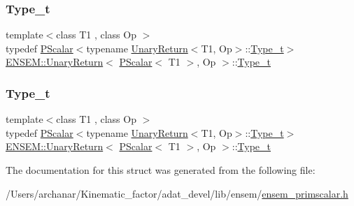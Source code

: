 \subsubsection{\texorpdfstring{Type\_t}{Type\_t}\hspace{0.1cm}{\footnotesize\ttfamily [1/2]}}
{\footnotesize\ttfamily template$<$class T1 , class Op $>$ \\
typedef \mbox{\hyperlink{classENSEM_1_1PScalar}{P\+Scalar}}$<$typename \mbox{\hyperlink{structENSEM_1_1UnaryReturn}{Unary\+Return}}$<$T1, Op$>$\+::\mbox{\hyperlink{structENSEM_1_1UnaryReturn_3_01PScalar_3_01T1_01_4_00_01Op_01_4_a75130a6bdc9f60586c1614ed4177aa96}{Type\+\_\+t}}$>$ \mbox{\hyperlink{structENSEM_1_1UnaryReturn}{E\+N\+S\+E\+M\+::\+Unary\+Return}}$<$ \mbox{\hyperlink{classENSEM_1_1PScalar}{P\+Scalar}}$<$ T1 $>$, Op $>$\+::\mbox{\hyperlink{structENSEM_1_1UnaryReturn_3_01PScalar_3_01T1_01_4_00_01Op_01_4_a75130a6bdc9f60586c1614ed4177aa96}{Type\+\_\+t}}}

\mbox{\label{structENSEM_1_1UnaryReturn_3_01PScalar_3_01T1_01_4_00_01Op_01_4_a75130a6bdc9f60586c1614ed4177aa96}} 
\subsubsection{\texorpdfstring{Type\_t}{Type\_t}\hspace{0.1cm}{\footnotesize\ttfamily [2/2]}}
{\footnotesize\ttfamily template$<$class T1 , class Op $>$ \\
typedef \mbox{\hyperlink{classENSEM_1_1PScalar}{P\+Scalar}}$<$typename \mbox{\hyperlink{structENSEM_1_1UnaryReturn}{Unary\+Return}}$<$T1, Op$>$\+::\mbox{\hyperlink{structENSEM_1_1UnaryReturn_3_01PScalar_3_01T1_01_4_00_01Op_01_4_a75130a6bdc9f60586c1614ed4177aa96}{Type\+\_\+t}}$>$ \mbox{\hyperlink{structENSEM_1_1UnaryReturn}{E\+N\+S\+E\+M\+::\+Unary\+Return}}$<$ \mbox{\hyperlink{classENSEM_1_1PScalar}{P\+Scalar}}$<$ T1 $>$, Op $>$\+::\mbox{\hyperlink{structENSEM_1_1UnaryReturn_3_01PScalar_3_01T1_01_4_00_01Op_01_4_a75130a6bdc9f60586c1614ed4177aa96}{Type\+\_\+t}}}



The documentation for this struct was generated from the following file\+:\begin{DoxyCompactItemize}
\item 
/\+Users/archanar/\+Kinematic\+\_\+factor/adat\+\_\+devel/lib/ensem/\mbox{\hyperlink{lib_2ensem_2ensem__primscalar_8h}{ensem\+\_\+primscalar.\+h}}\end{DoxyCompactItemize}
